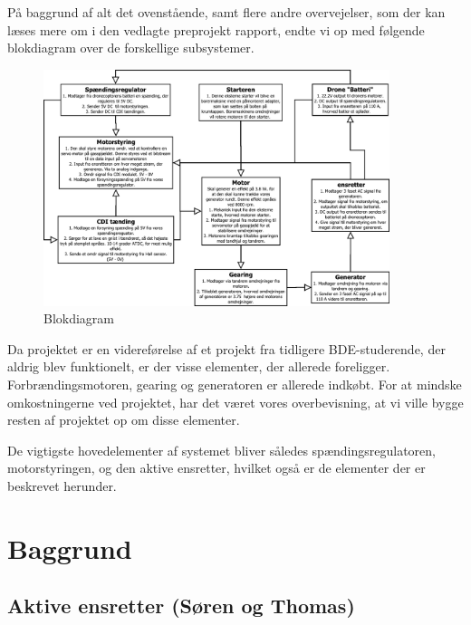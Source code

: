 På baggrund af alt det ovenstående, samt flere andre overvejelser, som der kan læses mere om i den vedlagte preprojekt rapport, endte vi op med følgende blokdiagram over de forskellige subsystemer.

\begin{figure}[h]
  \centering
  \includegraphics[width=0.9\textwidth]{./figurer/int22.pdf}
  \caption{Blokdiagram}
  \label{fig:int2}
\end{figure}

Da projektet er en videreførelse af et projekt fra tidligere BDE-studerende, der aldrig blev funktionelt, er der visse elementer, der allerede foreligger. Forbrændingsmotoren, gearing og generatoren er allerede indkøbt. For at mindske omkostningerne ved projektet, har det været vores overbevisning, at vi ville bygge resten af projektet op om disse elementer. 

De vigtigste hovedelementer af systemet bliver således spændingsregulatoren, motorstyringen, og den aktive ensretter, hvilket også er de elementer der er beskrevet herunder.

\chapter{Baggrund}
\label{sec:baggrund}

\section{Aktive ensretter (Søren og Thomas)}
\label{sec:aktive-ensretter}

